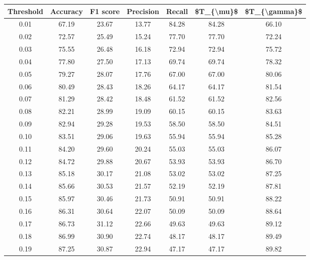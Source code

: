 \begin{tabular}{|c|c|c|c|c|c|c|}
\hline
 Threshold &  Accuracy &  F1 score &  Precision &  Recall &  \$T\_\{\textbackslash mu\}\$ &  \$T\_\{\textbackslash gamma\}\$ \\
\hline
      0.01 &     67.19 &     23.67 &      13.77 &   84.28 &      84.28 &         66.10 \\
      0.02 &     72.57 &     25.49 &      15.24 &   77.70 &      77.70 &         72.24 \\
      0.03 &     75.55 &     26.48 &      16.18 &   72.94 &      72.94 &         75.72 \\
      0.04 &     77.80 &     27.50 &      17.13 &   69.74 &      69.74 &         78.32 \\
      0.05 &     79.27 &     28.07 &      17.76 &   67.00 &      67.00 &         80.06 \\
      0.06 &     80.49 &     28.43 &      18.26 &   64.17 &      64.17 &         81.54 \\
      0.07 &     81.29 &     28.42 &      18.48 &   61.52 &      61.52 &         82.56 \\
      0.08 &     82.21 &     28.99 &      19.09 &   60.15 &      60.15 &         83.63 \\
      0.09 &     82.94 &     29.28 &      19.53 &   58.50 &      58.50 &         84.51 \\
      0.10 &     83.51 &     29.06 &      19.63 &   55.94 &      55.94 &         85.28 \\
      0.11 &     84.20 &     29.60 &      20.24 &   55.03 &      55.03 &         86.07 \\
      0.12 &     84.72 &     29.88 &      20.67 &   53.93 &      53.93 &         86.70 \\
      0.13 &     85.18 &     30.17 &      21.08 &   53.02 &      53.02 &         87.25 \\
      0.14 &     85.66 &     30.53 &      21.57 &   52.19 &      52.19 &         87.81 \\
      0.15 &     85.97 &     30.46 &      21.73 &   50.91 &      50.91 &         88.22 \\
      0.16 &     86.31 &     30.64 &      22.07 &   50.09 &      50.09 &         88.64 \\
      0.17 &     86.73 &     31.12 &      22.66 &   49.63 &      49.63 &         89.12 \\
      0.18 &     86.99 &     30.90 &      22.74 &   48.17 &      48.17 &         89.49 \\
      0.19 &     87.25 &     30.87 &      22.94 &   47.17 &      47.17 &         89.82 \\

\end{tabular}
